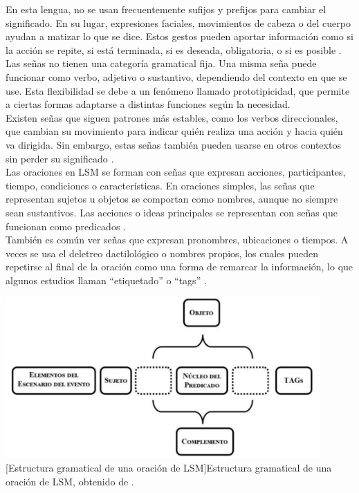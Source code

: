 En esta lengua, no se usan frecuentemente sufijos y prefijos para cambiar el significado. En su lugar, expresiones faciales, movimientos de cabeza o del cuerpo ayudan a matizar lo que se dice. Estos gestos pueden aportar información como si la acción se repite, si está terminada, si es deseada, obligatoria, o si es posible \cite{ref38}.\\

Las señas no tienen una categoría gramatical fija. Una misma seña puede funcionar como verbo, adjetivo o sustantivo, dependiendo del contexto en que se use. Esta flexibilidad se debe a un fenómeno llamado prototipicidad, que permite a ciertas formas adaptarse a distintas funciones según la necesidad.\\

Existen señas que siguen patrones más estables, como los verbos direccionales, que cambian su movimiento para indicar quién realiza una acción y hacia quién va dirigida. Sin embargo, estas señas también pueden usarse en otros contextos sin perder su significado \cite{ref38}.\\

Las oraciones en LSM se forman con señas que expresan acciones, participantes, tiempo, condiciones o características. En oraciones simples, las señas que representan sujetos u objetos se comportan como nombres, aunque no siempre sean sustantivos. Las acciones o ideas principales se representan con señas que funcionan como predicados \cite{ref38}.\\

También es común ver señas que expresan pronombres, ubicaciones o tiempos. A veces se usa el deletreo dactilológico o nombres propios, los cuales pueden repetirse al final de la oración como una forma de remarcar la información, lo que algunos estudios llaman “etiquetado” o “tags” \cite{ref38}.\\

\begin{center}
    \includegraphics[width=0.9\textwidth]{Images/Cap 2/Estructura_gramatica_LSM.png}
    [Estructura gramatical de una oración de LSM]{Estructura gramatical de una oración de LSM, obtenido de \cite{ref38}.}  %
\end{center}

